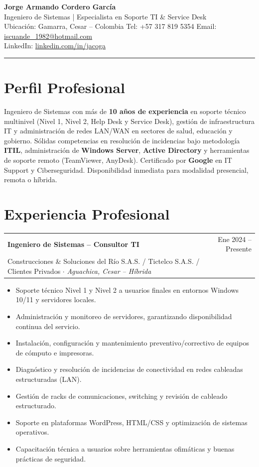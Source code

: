 \documentclass[10pt, letterpaper]{article}
\makeatletter
\newcommand{\cvheader}[5]{%
  \begin{center}
    {\LARGE\bfseries\color{primary} #1}\\[4pt]
    {\large\color{accent} #2}\\[6pt]
    {\small\color{darkgray}
      Ubicación: #3 \quad
      Tel: #4 \quad
      Email: \href{mailto:#5}{#5}
    }\\[2pt]
    {\small\color{darkgray}
      LinkedIn: \href{https://linkedin.com/in/jacoga}{linkedin.com/in/jacoga}
    }
  \end{center}
  \vspace{2pt}
  \textcolor{rulecol}{\rule{\linewidth}{2pt}}
  \vspace{4pt}
}
\newcommand{\cventry}[5]{%
  \noindent
  \begin{tabularx}{\linewidth}{@{}X r@{}}
    {\bfseries\color{primary} #1} & {\small\color{medgray} #2} \\
    {\small\color{accent} #3} $\cdot$ {\small\color{darkgray}\itshape #4} & \\
  \end{tabularx}
  \vspace{2pt}
  #5
  \vspace{6pt}
}
\makeatother
\begin{document}

\cvheader
  {Jorge Armando Cordero García}
  {Ingeniero de Sistemas | Especialista en Soporte TI \& Service Desk}
  {Gamarra, Cesar – Colombia}
  {+57 317 819 5354}
  {iscuande\_1982@hotmail.com}

\section{Perfil Profesional}

Ingeniero de Sistemas con más de \textbf{10 años de experiencia} en soporte técnico multinivel (Nivel 1, Nivel 2, Help Desk y Service Desk), gestión de infraestructura IT y administración de redes LAN/WAN en sectores de salud, educación y gobierno. Sólidas competencias en resolución de incidencias bajo metodología \textbf{ITIL}, administración de \textbf{Windows Server}, \textbf{Active Directory} y herramientas de soporte remoto (TeamViewer, AnyDesk). Certificado por \textbf{Google} en IT Support y Ciberseguridad. Disponibilidad inmediata para modalidad presencial, remota o híbrida.

\section{Experiencia Profesional}

\cventry
  {Ingeniero de Sistemas – Consultor TI}
  {Ene 2024 – Presente}
  {Construcciones \& Soluciones del Río S.A.S. / Tictelco S.A.S. / Clientes Privados}
  {Aguachica, Cesar – Híbrida}
  {
    \begin{itemize}
      \item Soporte técnico Nivel 1 y Nivel 2 a usuarios finales en entornos Windows 10/11 y servidores locales.
      \item Administración y monitoreo de servidores, garantizando disponibilidad continua del servicio.
      \item Instalación, configuración y mantenimiento preventivo/correctivo de equipos de cómputo e impresoras.
      \item Diagnóstico y resolución de incidencias de conectividad en redes cableadas estructuradas (LAN).
      \item Gestión de racks de comunicaciones, switching y revisión de cableado estructurado.
      \item Soporte en plataformas WordPress, HTML/CSS y optimización de sistemas operativos.
      \item Capacitación técnica a usuarios sobre herramientas ofimáticas y buenas prácticas de seguridad.
    \end{itemize}
  }
\end{document}
